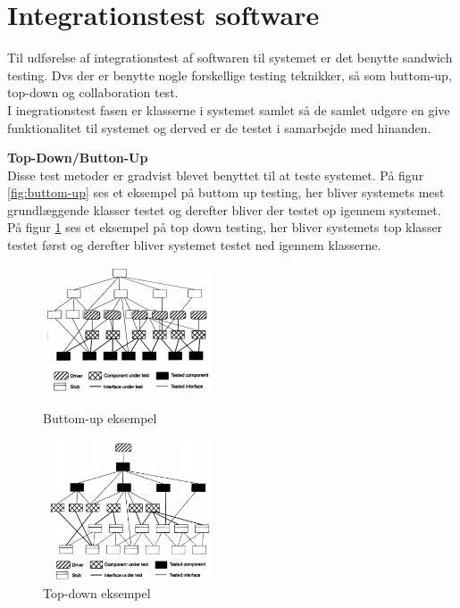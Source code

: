 \section{Integrationstest software}
Til udførelse af integrationstest af softwaren til systemet er det benytte sandwich testing. Dvs der er benytte nogle forskellige testing teknikker, så som buttom-up, top-down og collaboration test. \\
I inegrationstest fasen er klasserne i systemet samlet så de samlet udgøre en give funktionalitet til systemet og derved er de testet i samarbejde med hinanden.

\textbf{Top-Down/Button-Up}\\
Disse test metoder er gradvist blevet benyttet til at teste systemet. På figur \ref{fig:buttom-up} ses et eksempel på buttom up testing, her bliver systemets mest grundlæggende klasser testet og derefter bliver der testet op igennem systemet. På figur \ref{fig:top-down} ses et eksempel på top down testing, her bliver systemets top klasser testet først og derefter bliver systemet testet ned igennem klasserne.

\begin{figure}[ht]
\centering
\begin{minipage}[b]{0.45\linewidth}
\includegraphics[width=5cm]{Billeder/Test/buttom-up.png}
\caption{Buttom-up eksempel}
\label{fig:buttom-up}
\end{minipage}
\quad
\begin{minipage}[b]{0.45\linewidth}
\includegraphics[width=5cm]{Billeder/Test/top-down.png}
\caption{Top-down eksempel}
\label{fig:top-down}
\end{minipage}
\end{figure}
\vspace{2cm}

